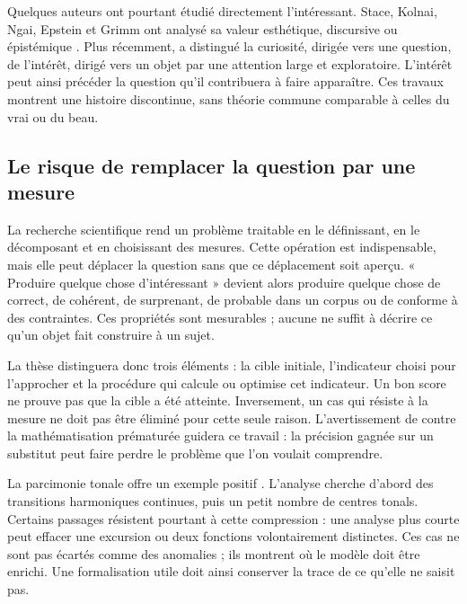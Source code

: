 \documentclass[11pt,a4paper]{article}
\begin{document}
Quelques auteurs ont pourtant étudié directement l'intéressant. Stace, Kolnai,
Ngai, Epstein et Grimm ont analysé sa valeur esthétique, discursive ou
épistémique \parencite{stace1944interestingness,kolnai1964concept,
ngai2008merely,epstein2009interesting,grimm2011interesting}. Plus récemment,
\textcite{vazard2026inquiry} a distingué la curiosité, dirigée vers une question,
de l'intérêt, dirigé vers un objet par une attention large et exploratoire.
L'intérêt peut ainsi précéder la question qu'il contribuera à faire apparaître.
Ces travaux montrent une histoire discontinue, sans théorie commune comparable
à celles du vrai ou du beau.

\subsection{Le risque de remplacer la question par une mesure}

La recherche scientifique rend un problème traitable en le définissant, en le
décomposant et en choisissant des mesures. Cette opération est indispensable,
mais elle peut déplacer la question sans que ce déplacement soit aperçu.
« Produire quelque chose d'intéressant » devient alors produire quelque chose
de correct, de cohérent, de surprenant, de probable dans un corpus ou de
conforme à des contraintes. Ces propriétés sont mesurables ; aucune ne suffit à
décrire ce qu'un objet fait construire à un sujet.

La thèse distinguera donc trois éléments : la cible initiale, l'indicateur choisi
pour l'approcher et la procédure qui calcule ou optimise cet indicateur. Un bon
score ne prouve pas que la cible a été atteinte. Inversement, un cas qui résiste
à la mesure ne doit pas être éliminé pour cette seule raison. L'avertissement de
\textcite{russell1995rationality} contre la mathématisation prématurée guidera
ce travail : la précision gagnée sur un substitut peut faire perdre le problème
que l'on voulait comprendre.

La parcimonie tonale offre un exemple positif
\parencite{pachet2026tonalparsimony}. L'analyse cherche d'abord des transitions
harmoniques continues, puis un petit nombre de centres tonals. Certains passages
résistent pourtant à cette compression : une analyse plus courte peut effacer
une excursion ou deux fonctions volontairement distinctes. Ces cas ne sont pas
écartés comme des anomalies ; ils montrent où le modèle doit être enrichi. Une
formalisation utile doit ainsi conserver la trace de ce qu'elle ne saisit pas.
\end{document}
